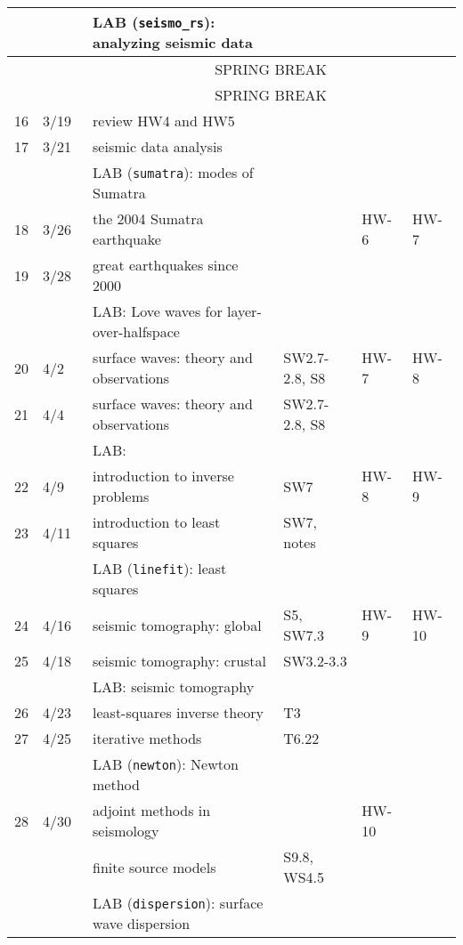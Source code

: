 \documentclass[10pt,titlepage,fleqn]{article}
\newcommand{\xxp}{3/19}
\newcommand{\xxq}{3/21}
\newcommand{\xxr}{3/26}
\newcommand{\xxs}{3/28}
\newcommand{\xxt}{4/2}
\newcommand{\xxu}{4/4}
\newcommand{\xxv}{4/9}
\newcommand{\xxw}{4/11}
\newcommand{\xxx}{4/16}
\newcommand{\xxy}{4/18}
\newcommand{\xxz}{4/23}
\newcommand{\xxaa}{4/25}
\newcommand{\xxbb}{4/30}
\begin{document}
\begin{enumerate}
\begin{tabular}{cl|l|l|ll}
   &         & LAB (\verb+seismo_rs+): analyzing seismic data & & & \\
\hline\hline
   &         & \multicolumn{4}{c}{SPRING BREAK} \\
   &         & \multicolumn{4}{c}{SPRING BREAK} \\
\hline\hline
16 & \xxp\   & review HW4 and HW5 & & & \\
17 & \xxq\   & seismic data analysis & & & \\
   &         & LAB (\verb+sumatra+): modes of Sumatra  & & & \\
\hline
18 & \xxr\   & the 2004 Sumatra earthquake & \cite{Lay2005,Ammon2005,Park2005,Ni2005} & HW-6 & HW-7 \\
19 & \xxs\   & great earthquakes since 2000 & & & \\
   &         & LAB: Love waves for layer-over-halfspace & & & \\
\hline
20 & \xxt\   & surface waves: theory and observations & SW2.7-2.8, S8 & HW-7 & HW-8 \\
21 & \xxu\   & surface waves: theory and observations & SW2.7-2.8, S8 & & \\
   &         & LAB: & & & \\
\hline
22 & \xxv\   & introduction to inverse problems & SW7 & HW-8 & HW-9 \\
23 & \xxw\   & introduction to least squares    & SW7, notes & & \\
   &         & LAB (\verb+linefit+): least squares & & & \\
\hline
24 & \xxx\   & seismic tomography: global & S5, SW7.3 & HW-9 & HW-10 \\
25 & \xxy\   & seismic tomography: crustal & SW3.2-3.3 & & \\
   &         & LAB: seismic tomography & & & \\
\hline
26 & \xxz\   & least-squares inverse theory & T3 & & \\
27 & \xxaa\  & iterative methods & T6.22 & & \\
   &         & LAB (\verb+newton+): Newton method & & & \\
\hline
28 & \xxbb\  & adjoint methods in seismology & \cite{LiuTromp2006,Tape2007} & HW-10 & \\
   &         & finite source models & S9.8, WS4.5 & & \\
   &         & LAB (\verb+dispersion+): surface wave dispersion & & & \\
\hline

\end{tabular}
\end{enumerate}
\end{document}
